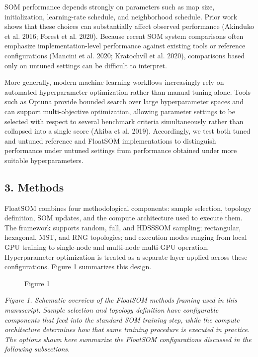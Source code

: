 \documentclass[
]{article}
\providecommand{\DIFadd}[1]{{\protect\color{blue} #1}} %
\providecommand{\DIFaddbegin}{} %
\providecommand{\DIFaddend}{} %
\begin{document}
SOM performance depends strongly on parameters such as map size,
initialization, learning-rate schedule, and neighborhood schedule. Prior
work shows that these choices can substantially affect observed
performance (Akinduko et al. 2016; Forest et al. 2020). Because recent
SOM system comparisons often emphasize implementation-level performance
against existing tools or reference configurations (Mancini et al. 2020;
Kratochvíl et al. 2020), comparisons based only on untuned  \DIFaddbegin \DIFadd{settings }\DIFaddend can
be difficult to interpret.

More generally, modern machine-learning workflows increasingly rely on
automated hyperparameter optimization rather than manual tuning alone.
Tools such as Optuna provide bounded search over large hyperparameter
spaces and can support multi-objective optimization, allowing parameter
settings to be selected with respect to several benchmark criteria
simultaneously rather than collapsed into a single score (Akiba et al.
2019). Accordingly, we test both tuned and untuned reference and
FloatSOM implementations to distinguish performance under untuned
 \DIFaddbegin \DIFadd{settings }\DIFaddend from performance obtained under more suitable hyperparameters.

\subsection{3. Methods}\label{methods}

FloatSOM combines four methodological components: sample selection,
topology definition, SOM updates, and the compute architecture used to
execute them. The framework supports random, full, and HDSSSOM sampling;
rectangular, hexagonal, MST, and RNG topologies; and execution modes
ranging from local GPU training to single-node and multi-node multi-GPU
operation. Hyperparameter optimization is treated as a separate layer
applied across these configurations. Figure 1 summarizes this design.

\begin{figure}
\centering

\caption{Figure 1}
\end{figure}

\emph{Figure 1. Schematic overview of the FloatSOM methods framing used
in this manuscript. Sample selection and topology definition have
configurable components that feed into the standard SOM training step,
while the compute architecture determines how that same training
procedure is executed in practice. The options shown here summarize the
FloatSOM configurations discussed in the following subsections.}
\end{document}
